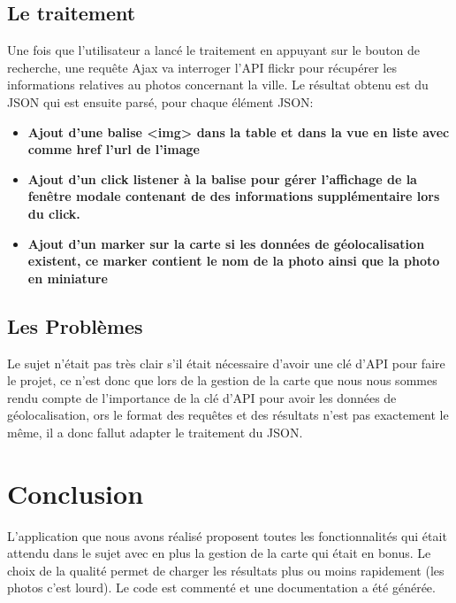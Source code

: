 \documentclass[a4paper, 11pt]{article}
\begin{document}
    \subsection*{Le traitement}
    Une fois que l'utilisateur a lancé le traitement en appuyant sur le bouton de recherche, une requête Ajax va interroger l'API flickr pour récupérer les informations relatives au photos concernant la ville. Le résultat obtenu est du JSON qui est ensuite parsé, pour chaque élément JSON:
        \newline
        \begin{itemize}
            \item \textbf{Ajout d'une balise <img> dans la table et dans la vue en liste avec comme href l'url de l'image}
            \item \textbf{Ajout d'un click listener à la balise pour gérer l'affichage de la fenêtre modale contenant de des informations supplémentaire lors du click.}
            \item \textbf{Ajout d'un marker sur la carte si les données de géolocalisation existent, ce marker contient le nom de la photo ainsi que la photo en miniature}
        \end{itemize}
    \subsection*{Les Problèmes}
        Le sujet n'était pas très clair s'il était nécessaire d'avoir une clé d'API pour faire le projet, ce n'est donc que lors de la gestion de la carte que nous nous sommes rendu compte de l'importance de la clé d'API pour avoir les données de géolocalisation, ors le format des requêtes et des résultats n'est pas exactement le même, il a donc fallut adapter le traitement du JSON.

\section*{Conclusion }
L'application que nous avons réalisé proposent toutes les fonctionnalités qui était attendu dans le sujet avec en plus la gestion de la carte qui était en bonus.
Le choix de la qualité permet de charger les résultats plus ou moins rapidement (les photos c'est lourd). Le code est commenté et une documentation a été générée.
\end{document}
